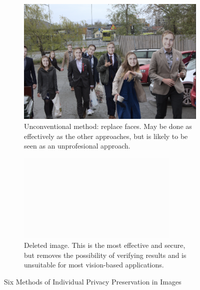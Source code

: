 \begin{figure}[H]
    \begin{subfigure}{0.43\textwidth}
        \centering
        \includegraphics[width=\textwidth]{Images/Obfuscation/me_my_friends_and_I.png}
        \caption{\centering Unconventional method: replace faces. May be done as effectively as the other approaches, but is likely to be seen as an unprofesional approach.}
    \end{subfigure}
    \hfill
    \begin{subfigure}{0.43\textwidth}
        \centering
        \includegraphics[width=\textwidth]{Images/Obfuscation/white.png}
        \caption{\centering Deleted image. This is the most effective and secure, but removes the possibility of verifying results and is unsuitable for most vision-based applications.}
    \end{subfigure}

    \caption{\centering Six Methods of Individual Privacy Preservation in Images}
    \label{fig:obfuscation_methods}
\end{figure}

